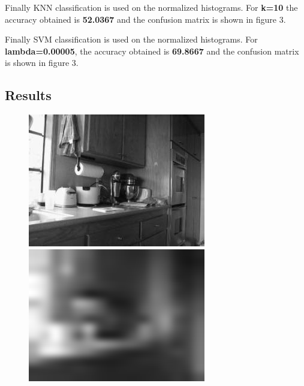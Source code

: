 \documentclass[letter, 11pt]{article}
\begin{document}
Finally KNN classification is used on the normalized histograms. For \textbf{k=10} the accuracy obtained is \textbf{52.0367} and the confusion matrix is shown in figure 3.

Finally SVM classification is used on the normalized histograms. For \textbf{lambda=0.00005}, the accuracy obtained is \textbf{69.8667} and the confusion matrix is shown in figure 3.

\subsection*{Results}
\begin{figure}[h]
        \centering
        \includegraphics[width=\textwidth]{HW3/RESULT/original.png}
    \endminipage\hfill
        \centering
        \includegraphics[width=\textwidth]{HW3/RESULT/tiny.png}
    \endminipage\hfill
\end{figure}
\end{document}
